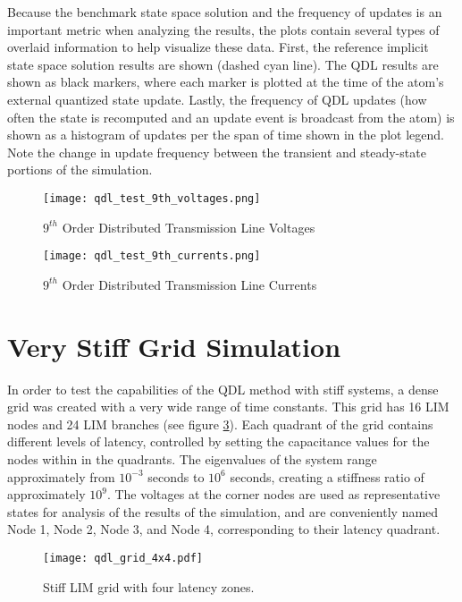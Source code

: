 Because the benchmark state space solution and the frequency of updates is an important metric when analyzing the results, the plots contain several types of overlaid information to help visualize these data. First, the reference implicit state space solution results are shown (dashed cyan line). The QDL results are shown as black markers, where each marker is plotted at the time of the atom's external quantized state update. Lastly, the frequency of QDL updates (how often the state is recomputed and an update event is broadcast from the atom) is shown as a histogram of updates per the span of time shown in the plot legend. Note the change in update frequency between the transient and steady-state portions of the simulation.

\begin{figure}[ht]   
    \centering     
    \texttt{[image: qdl\_test\_9th\_voltages.png]}
    \caption{$9^{th}$ Order Distributed Transmission Line Voltages}     
    \label{fig:qdl_test_9th_voltages}
\end{figure} 


\begin{figure}[ht]   
    \centering     
    \texttt{[image: qdl\_test\_9th\_currents.png]}
    \caption{$9^{th}$ Order Distributed Transmission Line Currents} 
    \label{fig:qdl_test_9th_currents}
\end{figure} 

\section{Very Stiff Grid Simulation}

In order to test the capabilities of the QDL method with stiff systems, a dense grid was created with a very wide range of time constants. This grid has 16 LIM nodes and 24 LIM branches (see figure \ref{fig:qdl_grid_4x4}). Each quadrant of the grid contains different levels of latency, controlled by setting the capacitance values for the nodes within in the quadrants. The eigenvalues of the system range approximately from $10^{-3}$ seconds to $10^6$ seconds, creating a stiffness ratio of approximately $10^9$. The voltages at the corner nodes are used as representative states for analysis of the results of the simulation, and are conveniently named Node 1, Node 2, Node 3, and Node 4, corresponding to their latency quadrant. 

\begin{figure}[htb]
    \centering
    \texttt{[image: qdl\_grid\_4x4.pdf]}
    \caption{Stiff LIM grid with four latency zones.}
    \label{fig:qdl_grid_4x4}
\end{figure}   

